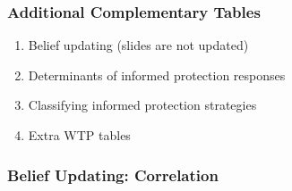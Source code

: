 \documentclass[11pt,hyperref={bookmarks=false}]{beamer}
\begin{document}
\begin{frame}
\frametitle{Additional Complementary Tables}
\begin{enumerate}
\item Belief updating (slides are not updated)
\item Determinants of informed protection responses
\item Classifying informed protection strategies
\item Extra WTP tables
\end{enumerate}
\end{frame}

\begin{frame}
\frametitle{Belief Updating: Correlation}


\end{frame}
\end{document}
